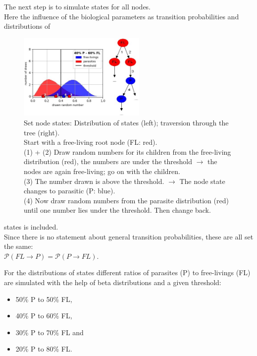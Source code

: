     The next step is to simulate states for all nodes. \\
    Here the influence of the biological parameters as transition probabilities and distributions of
      \begin{figure}
        \centering
        \includegraphics[width=0.55\textwidth]{Figures/40-60_all.jpg}
        \caption{Set node states: Distribution of states (left); traversion through the tree (right). \\
          Start with a free-living root node (FL: red). \\
          (1) + (2) Draw random numbers for its children from the free-living distribution (red), the numbers are under the threshold 
          $\rightarrow$ the nodes are again free-living; go on with the children. \\
          (3) The number drawn is above the threshold. $\rightarrow$ The node state changes to parasitic (P: blue). \\
          (4) Now draw random numbers from the parasite distribution (red) until one number lies under the threshold. Then change back.}
        \label{fig:set node states}
      \end{figure} 
      states is included. \\
    Since there is no statement about general transition probabilities, these are all set the same: \\
    $\mathcal{P}(FL \rightarrow P) = \mathcal{P}(P \rightarrow FL)$.

    For the distributions of states different ratios of parasites (P) to free-livings (FL) are 
      simulated with the help of beta distributions and a given threshold:
      \begin{itemize}
        \item 50\% P to 50\% FL,
        \item 40\% P to 60\% FL,
        \item 30\% P to 70\% FL and 
        \item 20\% P to 80\% FL.
      \end{itemize}

